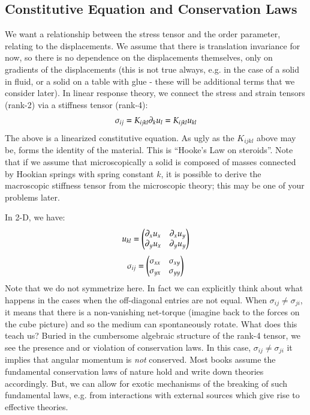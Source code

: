 \subsection{Constitutive Equation and Conservation Laws}
We want a relationship between the stress tensor and the order parameter, relating to the displacements. We assume that there is translation invariance for now, so there is no dependence on the displacements themselves, only on gradients of the displacements (this is not true always, e.g. in the case of a solid in fluid, or a solid on a table with glue - these will be additional terms that we consider later). In linear response theory, we connect the stress and strain tensors (rank-2) via a stiffness tensor (rank-4):
\begin{equation}
    \sigma_{ij} = K_{ijkl}\partial_k u_l = K_{ijkl}u_{kl}
\end{equation}
The above is a linearized constitutive equation. As ugly as the $K_{ijkl}$ above may be, forms the identity of the material. This is ``Hooke's Law on steroids''. Note that if we assume that microscopically a solid is composed of masses connected by Hookian springs with spring constant $k$, it is possible to derive the macroscopic stiffness tensor from the microscopic theory; this may be one of your problems later.

In 2-D, we have:
\begin{equation}
    u_{kl} = \begin{pmatrix}\partial_x u_x & \partial_x u_y \\ \partial_y u_x & \partial_y u_y\end{pmatrix}
\end{equation}
\begin{equation}
    \sigma_{ij} = \begin{pmatrix}\sigma_{xx} & \sigma_{xy} \\ \sigma_{yx} & \sigma_{yy}\end{pmatrix}
\end{equation}
Note that we do not symmetrize here. In fact we can explicitly think about what happens in the cases when the off-diagonal entries are not equal. When $\sigma_{ij} \neq \sigma_{ji}$, it means that there is a non-vanishing net-torque (imagine back to the forces on the cube picture) and so the medium can spontaneously rotate. What does this teach us? Buried in the cumbersome algebraic structure of the rank-4 tensor, we see the presence and or violation of conservation laws. In this case, $\sigma_{ij} \neq \sigma_{ji}$ it implies that angular momentum is \emph{not} conserved. Most books assume the fundamental conservation laws of nature hold and write down theories accordingly. But, we can allow for exotic mechanisms of the breaking of such fundamental laws, e.g. from interactions with external sources which give rise to effective theories.

